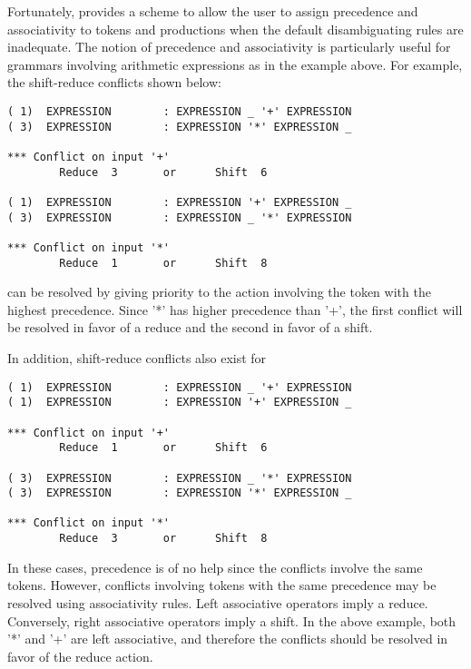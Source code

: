 Fortunately, \ayacc provides a scheme to allow the user to assign precedence
and associativity to tokens and productions when the default
disambiguating rules are inadequate.  The notion of precedence
and associativity is particularly useful for grammars involving
arithmetic expressions as in the example above.  For example, the
shift-reduce conflicts shown below:
\begin{verbatim}
( 1)  EXPRESSION        : EXPRESSION _ '+' EXPRESSION
( 3)  EXPRESSION        : EXPRESSION '*' EXPRESSION _

*** Conflict on input '+'
        Reduce  3       or      Shift  6

( 1)  EXPRESSION        : EXPRESSION '+' EXPRESSION _
( 3)  EXPRESSION        : EXPRESSION _ '*' EXPRESSION

*** Conflict on input '*'
        Reduce  1       or      Shift  8

\end{verbatim}
can be resolved by giving priority to the action involving the token with
the highest precedence.  Since '*' has higher precedence
than '+', the first conflict will be resolved in favor of a
reduce and the second in favor of a shift.

In addition, shift-reduce conflicts  also exist for
\newpage
\begin{verbatim}
( 1)  EXPRESSION        : EXPRESSION _ '+' EXPRESSION
( 1)  EXPRESSION        : EXPRESSION '+' EXPRESSION _

*** Conflict on input '+'
        Reduce  1       or      Shift  6

( 3)  EXPRESSION        : EXPRESSION _ '*' EXPRESSION
( 3)  EXPRESSION        : EXPRESSION '*' EXPRESSION _

*** Conflict on input '*'
        Reduce  3       or      Shift  8

\end{verbatim}

In these cases, precedence is of no help since the conflicts
involve the same tokens.  However, conflicts involving tokens
with the same precedence may be resolved using associativity rules.  Left
associative operators imply a reduce.  Conversely, right
associative operators imply a shift.  In the above example,
both '*' and '+' are left associative, and therefore the
conflicts should be resolved in favor of the reduce action.

